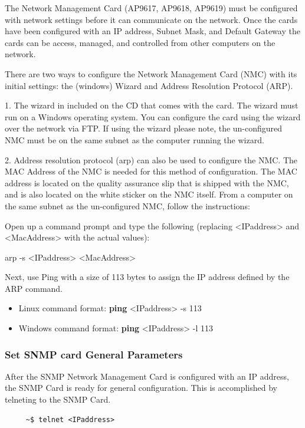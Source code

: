 {{{{{{{\normalsize
The Network Management Card (AP9617, AP9618, AP9619) must be configured with
network settings before it can communicate on the network. Once the cards have been
configured with an IP address, Subnet Mask, and Default Gateway the cards can be
access, managed, and controlled from other computers on the network.

There are two ways to configure the Network Management Card (NMC) with its
initial settings: the (windows) Wizard and Address Resolution Protocol (ARP).

1.  The wizard in included on the CD that comes with the card.  The wizard must
run on a Windows operating system.  You can configure the card using the wizard over
the network via FTP.  If using the wizard please note, the un-configured NMC must
be on the same subnet as the computer running the wizard.

2.  Address resolution protocol (arp) can also be used to configure the NMC.  The MAC
Address of the NMC is needed for this method of configuration.  The MAC address is
located on the quality assurance slip that is shipped with the NMC, and is also
located on the white sticker on the NMC itself.  From a computer on the same
subnet as the un-configured NMC, follow the instructions:

Open up a command prompt and type the following (replacing <IPaddress> and <MacAddress>
with the actual values):

arp -s <IPaddress> <MacAddress>

Next, use Ping with a size of 113 bytes to assign the IP address defined by the ARP
command.

\begin{itemize}
\item Linux command format:   {\bf ping} <IPaddress> -s 113
\item Windows command format: {\bf ping} <IPaddress> -l 113
\end{itemize}


\subsubsection*{Set SNMP card General Parameters}
After the SNMP Network Management Card is configured with an IP address, the SNMP Card
is ready for general configuration.  This is accomplished by telneting to the SNMP Card.

\footnotesize
\begin{verbatim}
     ~$ telnet <IPaddress>
\end{verbatim}
\normalsize

}}}}}}}
